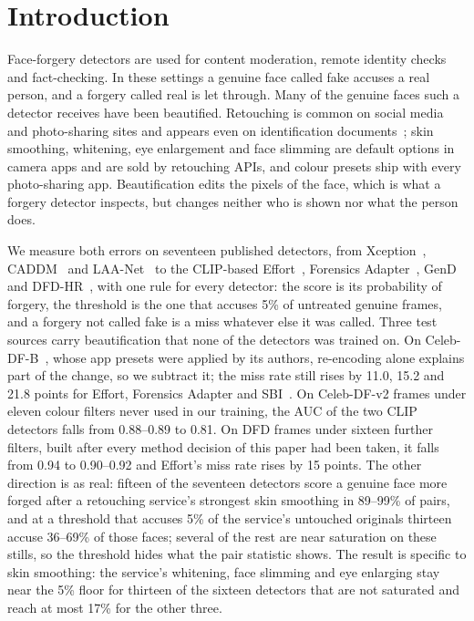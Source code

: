\documentclass[conference]{IEEEtran}
\begin{document}
\section{Introduction}
Face-forgery detectors are used for content moderation, remote identity checks and fact-checking. In these settings a
genuine face called fake accuses a real person, and a forgery called real is let through. Many of the genuine faces such a
detector receives have been beautified. Retouching is common on social media and photo-sharing sites and appears even on
identification documents~\cite{bharati2016}; skin smoothing, whitening, eye enlargement and face slimming are default
options in camera apps and are sold by retouching APIs, and colour presets ship with every photo-sharing app.
Beautification edits the pixels of the face, which is what a forgery detector inspects, but changes neither who is shown
nor what the person does.

We measure both errors on seventeen published detectors, from Xception~\cite{xception}, CADDM~\cite{caddm} and
LAA-Net~\cite{laanet} to the CLIP-based Effort~\cite{effort}, Forensics Adapter~\cite{forensicsadapter},
GenD~\cite{gend2026} and DFD-HR~\cite{dfdhr2026}, with one rule for every detector: the score is its
probability of forgery, the threshold is the one that accuses 5\% of untreated genuine frames, and a forgery not called
fake is a miss whatever else it was called. Three test sources carry beautification that none of the detectors was
trained on. On Celeb-DF-B~\cite{libourel2024}, whose app presets were applied by its authors, re-encoding alone explains
part of the change, so we subtract it; the miss rate still rises by 11.0, 15.2 and 21.8 points for Effort, Forensics
Adapter and SBI~\cite{sbi}. On Celeb-DF-v2 frames under eleven colour filters never used in our training, the AUC of the
two CLIP detectors falls from 0.88--0.89 to 0.81. On DFD frames under sixteen further filters, built after every method
decision of this paper had been taken, it falls from 0.94 to 0.90--0.92 and Effort's miss rate rises by 15 points. The
other direction is as real: fifteen of the seventeen detectors score a genuine face more forged after a retouching
service's strongest skin smoothing in 89--99\% of pairs, and at a threshold that accuses 5\% of the service's untouched
originals thirteen accuse 36--69\% of those faces; several of the rest are near saturation on these stills, so the
threshold hides what the pair statistic shows. The result is specific to skin smoothing: the service's whitening, face
slimming and eye enlarging stay near the 5\% floor for thirteen of the sixteen detectors that are not saturated and
reach at most 17\% for the other three.
\end{document}
